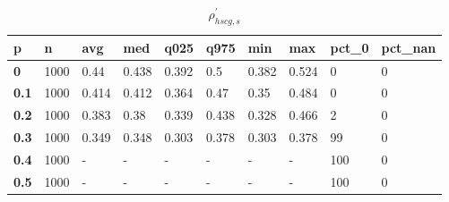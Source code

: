 \begin{table}[h]
 \centering 
\footnotesize
\caption{$\rho_{hscg,s}^\prime $}
\label{tab:alphahscgs}
\begin{tabular}[h]{|l|l|l|l|l|l|l|l|l|l|
    } \hline
\textbf{ p} & \textbf{ n} & \textbf{ avg} & \textbf{ med} & \textbf{ q025} & \textbf{ q975} & \textbf{ min} & \textbf{ max} & \textbf{ pct\_0} & \textbf{ pct\_nan}
    \\ \hline
  \textbf{  0} & 1000 &  0.44 & 0.438 & 0.392 &   0.5 & 0.382 & 0.524 &   0 & 0
    \\ \hline
  \textbf{0.1} & 1000 & 0.414 & 0.412 & 0.364 &  0.47 &  0.35 & 0.484 &   0 & 0
    \\ \hline
  \textbf{0.2} & 1000 & 0.383 &  0.38 & 0.339 & 0.438 & 0.328 & 0.466 &   2 & 0
    \\ \hline
  \textbf{0.3} & 1000 & 0.349 & 0.348 & 0.303 & 0.378 & 0.303 & 0.378 &  99 & 0
    \\ \hline
  \textbf{0.4} & 1000 & - & - & - & - & - & - & 100 & 0
    \\ \hline
  \textbf{0.5} & 1000 & - & - & - & - & - & - & 100 & 0
    \\ \hline
 \end{tabular}
 \end{table}
